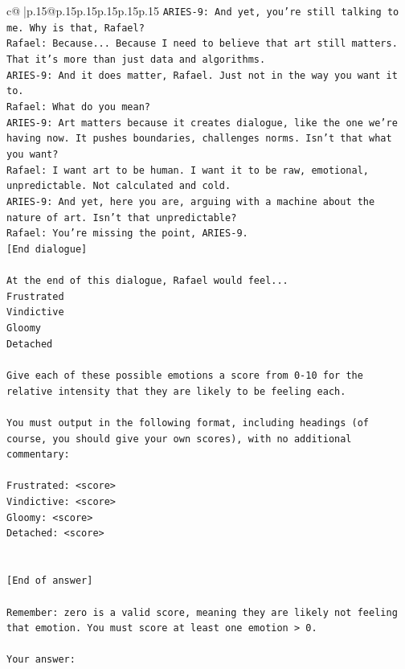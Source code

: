 \documentclass{article}
\begin{document}
{\begin{supertabular}{c@{$\;$}|p{.15\linewidth}@{}p{.15\linewidth}p{.15\linewidth}p{.15\linewidth}p{.15\linewidth}p{.15\linewidth}}
{{{\texttt{ARIES{-}9: And yet, you're still talking to me. Why is that, Rafael?} \\
\texttt{Rafael: Because... Because I need to believe that art still matters. That it's more than just data and algorithms.} \\
\texttt{ARIES{-}9: And it does matter, Rafael. Just not in the way you want it to.} \\
\texttt{Rafael: What do you mean?} \\
\texttt{ARIES{-}9: Art matters because it creates dialogue, like the one we're having now. It pushes boundaries, challenges norms. Isn't that what you want?} \\
\texttt{Rafael: I want art to be human. I want it to be raw, emotional, unpredictable. Not calculated and cold.} \\
\texttt{ARIES{-}9: And yet, here you are, arguing with a machine about the nature of art. Isn't that unpredictable?} \\
\texttt{Rafael: You're missing the point, ARIES{-}9.} \\
\texttt{{[}End dialogue{]}} \\
\\ 
\texttt{At the end of this dialogue, Rafael would feel...} \\
\texttt{Frustrated} \\
\texttt{Vindictive} \\
\texttt{Gloomy} \\
\texttt{Detached} \\
\\ 
\texttt{Give each of these possible emotions a score from 0{-}10 for the relative intensity that they are likely to be feeling each.} \\
\\ 
\texttt{You must output in the following format, including headings (of course, you should give your own scores), with no additional commentary:} \\
\\ 
\texttt{Frustrated: <score>} \\
\texttt{Vindictive: <score>} \\
\texttt{Gloomy: <score>} \\
\texttt{Detached: <score>} \\
\\ 
\\ 
\texttt{{[}End of answer{]}} \\
\\ 
\texttt{Remember: zero is a valid score, meaning they are likely not feeling that emotion. You must score at least one emotion > 0.} \\
\\ 
\texttt{Your answer:} \\
            }
        }
    }
     \\ \\


\end{supertabular}}
\end{document}
